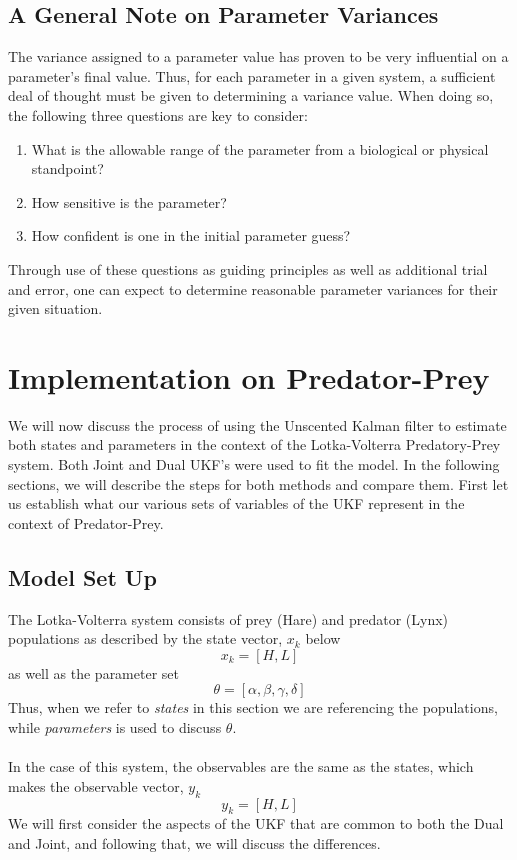 \documentclass{article}
\begin{document}
\subsection{A General Note on Parameter Variances}
The variance assigned to a parameter value has proven to be very influential on a parameter's final value. Thus, for each parameter in a given system, a sufficient deal of thought must be given to determining a variance value. When doing so, the following three questions are key to consider:
\begin{enumerate}
    \item What is the allowable range of the parameter from a biological or physical standpoint?
    \item How sensitive is the parameter?
    \item How confident is one in the initial parameter guess?
\end{enumerate}
Through use of these questions as guiding principles as well as additional trial and error, one can expect to determine reasonable parameter variances for their given situation.


\section{Implementation on Predator-Prey}
We will now discuss the process of using the Unscented Kalman filter to estimate both states and parameters in the context of the Lotka-Volterra Predatory-Prey system. Both Joint and Dual UKF's were used to fit the model. In the following sections, we will describe the steps for both methods and compare them. First let us establish what our various sets of variables of the UKF represent in the context of Predator-Prey.

\subsection{Model Set Up}
The Lotka-Volterra system consists of prey (Hare) and predator (Lynx) populations as described by the state vector, $x_k$ below \\
\begin{equation}
x_k = [H, L]
\end{equation}
as well as the parameter set
\begin{equation}
\theta = [\alpha, \beta, \gamma, \delta]
\end{equation}
Thus, when we refer to \emph{states} in this section we are referencing the populations, while \emph{parameters} is used to discuss $\theta$. \\
\\
In the case of this system, the observables are the same as the states, which makes the observable vector, $y_k$
\begin{equation}
y_k = [H, L]
\end{equation}
We will first consider the aspects of the UKF that are common to both the Dual and Joint, and following that, we will discuss the differences.
\end{document}

